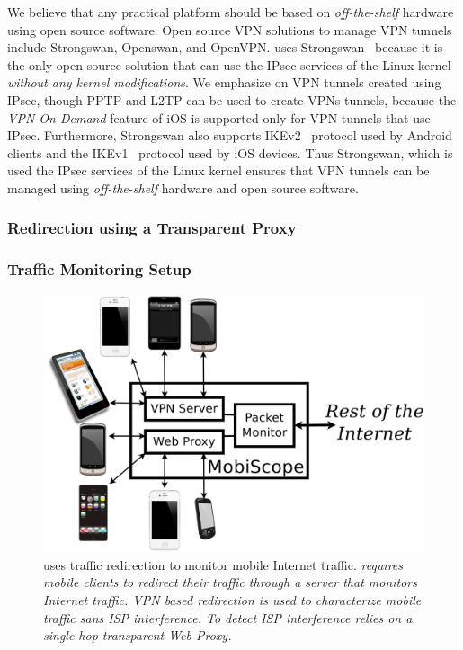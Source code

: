 We believe that any practical platform should be based on \emph{off-the-shelf} hardware using open source software. 
Open source VPN solutions to manage VPN tunnels include Strongswan, Openswan, and OpenVPN.
\platname uses Strongswan~\cite{strongswan} because it is the only open source solution that can use the IPsec services of the Linux kernel \emph{without any kernel modifications}.
We emphasize on VPN tunnels created using IPsec, though PPTP and L2TP can be used to create VPNs tunnels, because the \emph{VPN On-Demand} feature of iOS is supported only for VPN tunnels that use IPsec.
Furthermore, Strongswan also supports IKEv2~\cite{rfc5996} protocol used by Android clients and the IKEv1~\cite{rfc4109} protocol used by iOS devices. 
Thus Strongswan, which is used the IPsec services of the Linux kernel ensures that VPN tunnels can be managed using \emph{off-the-shelf} hardware and open source software.

\subsubsection{Redirection using a Transparent Proxy} 



\subsubsection{Traffic Monitoring Setup}

\begin{figure}
\includegraphics[width=\columnwidth]{figures/meddle-servers.pdf}
\caption{\platname uses traffic redirection to monitor mobile Internet traffic. \platname \emph{requires mobile clients to redirect their traffic through a server that monitors Internet traffic. VPN based redirection is used to characterize mobile traffic sans ISP interference. To detect ISP interference \platname relies on a single hop transparent Web Proxy.}}
\label{fig:description}
\end{figure}

